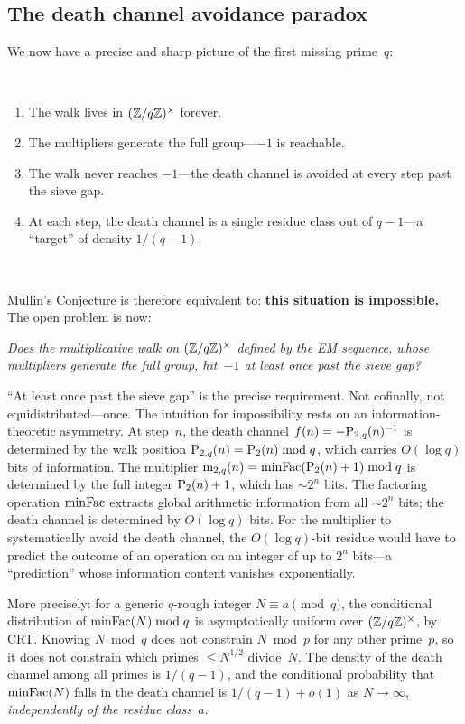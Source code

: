 \subsection{The death channel avoidance paradox}

We now have a precise and sharp picture of the first missing prime~$q$:

\

\begin{enumerate}[nosep]
\item The walk lives in $(\mathbb{Z}/q\mathbb{Z})^\times$ forever.
\item The multipliers generate the full group---$-1$ is reachable.
\item The walk never reaches $-1$---the death channel is avoided at
  every step past the sieve gap.
\item At each step, the death channel is a single residue class out
  of $q - 1$---a ``target'' of density $1/(q-1)$.
\end{enumerate}

\

\noindent Mullin's Conjecture is therefore equivalent to: \textbf{this situation
is impossible.}  The open problem is now:

\begin{center}
\emph{Does the multiplicative walk on $(\mathbb{Z}/q\mathbb{Z})^\times$ defined by
the EM sequence, whose multipliers generate the full group, hit~$-1$
at least once past the sieve gap?}
\end{center}

``At least once past the sieve gap'' is the precise requirement.  Not
cofinally, not equidistributed---once.
The intuition for impossibility rests on an information-theoretic
asymmetry.  At step~$n$, the death channel
$f(n) = -\mathrm{P}_{2,q}(n)^{-1}$ is determined by the walk position
$\mathrm{P}_{2,q}(n) = \mathrm{P}_{2}(n) \bmod q$, which carries $O(\log q)$ bits of
information.  The multiplier
$\mathrm{m}_{2,q}(n) = \mathrm{minFac}(\mathrm{P}_{2}(n)+1) \bmod q$ is determined by the
full integer $\mathrm{P}_{2}(n)+1$, which has $\sim 2^n$ bits.  The factoring
operation $\mathrm{minFac}$ extracts global arithmetic information from all
$\sim 2^n$ bits; the death channel is determined by $O(\log q)$ bits.
For the multiplier to systematically avoid the death channel, the
$O(\log q)$-bit residue would have to predict the outcome of an
operation on an integer of up to $2^n$ bits---a ``prediction'' whose information
content vanishes exponentially.

More precisely: for a generic $q$-rough integer $N \equiv a \pmod{q}$,
the conditional distribution of $\mathrm{minFac}(N) \bmod q$ is
asymptotically uniform over $(\mathbb{Z}/q\mathbb{Z})^\times$, by CRT\@.  Knowing
$N \bmod q$ does not constrain $N \bmod p$ for any other prime~$p$,
so it does not constrain which primes $\leq N^{1/2}$ divide~$N$.  The
density of the death channel among all primes is $1/(q-1)$, and the
conditional probability that $\mathrm{minFac}(N)$ falls in the death channel
is $1/(q-1) + o(1)$ as $N \to \infty$, \emph{independently of the
residue class~$a$}.

